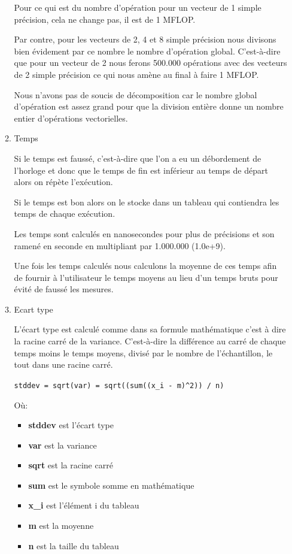 \documentclass[11pt, letterpaper]{article}
\begin{document}
\begin{enumerate}
\begin{enumerate}
Pour ce qui est du nombre d'opération pour un vecteur de 1 simple
précision, cela ne change pas, il est de 1 MFLOP.

Par contre, pour les vecteurs de 2, 4 et 8 simple précision nous divisons
bien évidement par ce nombre le nombre d'opération global. C'est-à-dire
que pour un vecteur de 2 nous ferons 500.000 opérations avec des vecteurs
de 2 simple précision ce qui nous amène au final à faire 1 MFLOP.

Nous n'avons pas de soucis de décomposition car le nombre global
d'opération est assez grand pour que la division entière donne un nombre
entier d'opérations vectorielles.

\item Temps
\label{sec:orgf680051}

Si le temps est faussé, c'est-à-dire que l'on a eu un débordement de
l'horloge et donc que le temps de fin est inférieur au temps de départ
alors on répète l'exécution.

Si le temps est bon alors on le stocke dans un tableau qui contiendra les
temps de chaque exécution.

Les temps sont calculés en nanosecondes pour plus de précisions et son
ramené en seconde en multipliant par 1.000.000 (1.0e+9).

Une fois les temps calculés nous calculons la moyenne de ces temps afin de
fournir à l'utilisateur le temps moyens au lieu d'un temps bruts pour
évité de faussé les mesures.

\item Ecart type
\label{sec:org2f2d94a}

L'écart type est calculé comme dans sa formule mathématique c'est à dire
la racine carré de la variance. C'est-à-dire la différence au carré de
chaque temps moins le temps moyens, divisé par le nombre de l'échantillon,
le tout dans une racine carré.

\texttt{stddev = sqrt(var) = sqrt((sum((x\_i - m)\textasciicircum{}2)) / n)}

Où:
\begin{itemize}
\item \textbf{stddev} est l'écart type
\item \textbf{var} est la variance
\item \textbf{sqrt} est la racine carré
\item \textbf{sum} est le symbole somme en mathématique
\item \textbf{x\_i} est l'élément i du tableau
\item \textbf{m} est la moyenne
\item \textbf{n} est la taille du tableau
\end{itemize}


\end{enumerate}
\end{enumerate}
\end{document}
